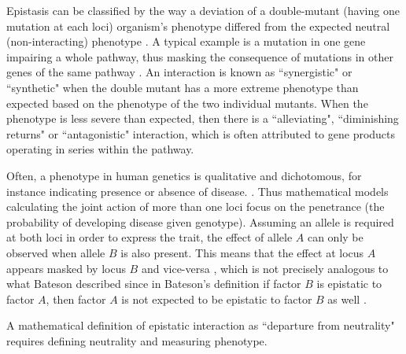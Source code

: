 Epistasis can be classified by the way a deviation of a double-mutant (having one mutation at each loci) organism's phenotype differed from the expected neutral (non-interacting) phenotype \cite{mani2008defining}.
A typical example is a mutation in one gene impairing a whole pathway, thus masking the consequence of mutations in other genes of the same pathway \cite{mani2008defining}.
An interaction is known as ``synergistic" or ``synthetic" when the double mutant has a more extreme phenotype than expected based on the phenotype of the two individual mutants.
When the phenotype is less severe than expected, then there is a ``alleviating", ``diminishing returns" or ``antagonistic" interaction, which is often attributed to gene products operating in series within the pathway. 

Often, a phenotype in human genetics is qualitative and dichotomous, for instance indicating presence or absence of disease. \cite{cordell2002epistasis}.
Thus mathematical models calculating the joint action of more than one loci focus on the penetrance (the probability of developing disease given genotype).
Assuming an allele is required at both loci in order to express the trait, the effect of allele $A$ can only be observed when allele $B$ is also present.
This means that the effect at locus $A$ appears masked by locus $B$ and vice-versa \cite{cordell2002epistasis}, which is not precisely analogous to
what Bateson described since in Bateson's definition if factor $B$ is epistatic to factor $A$, then factor $A$ is not expected to be epistatic to factor $B$ as well \cite{cordell2002epistasis}.

A mathematical definition of epistatic interaction as ``departure from neutrality" requires defining neutrality and measuring phenotype.


